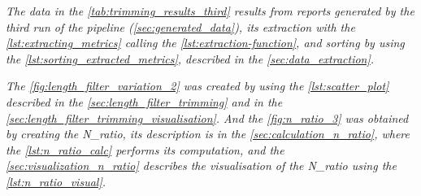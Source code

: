 \begin{table}[ht!]
\centering
\caption{The Third Trimming Strategy and Its Impact on Assembly Metrics}
\label{tab:trimming_results_third}
\end{table}

\textit{The data in the \autoref{tab:trimming_results_third} results from reports generated by the third run of the pipeline (\autoref{sec:generated_data}), its extraction with the \autoref{lst:extracting_metrics} calling the \autoref{lst:extraction-function}, and sorting by using the \autoref{lst:sorting_extracted_metrics}, described in the  \autoref{sec:data_extraction}.}

\textit{The \autoref{fig:length_filter_variation_2} was created by using the \autoref{lst:scatter_plot} described in the  \autoref{sec:length_filter_trimming} and in the  \autoref{sec:length_filter_trimming_visualisation}. And the \autoref{fig:n_ratio_3} was obtained by creating the N\_ratio, its description is in the  \autoref{sec:calculation_n_ratio}, where the \autoref{lst:n_ratio_calc} performs its computation, and the \autoref{sec:visualization_n_ratio} describes the visualisation of the N\_ratio using the  \autoref{lst:n_ratio_visual}.}



